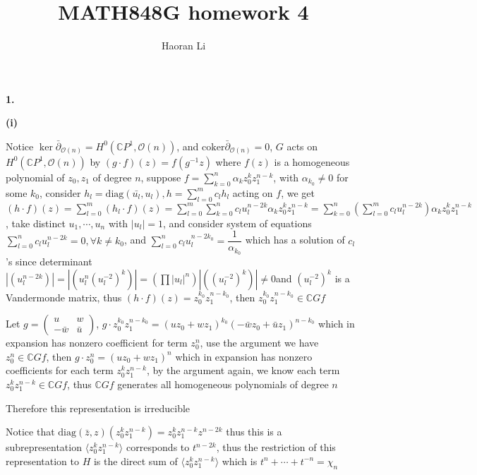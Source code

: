 \documentclass[10pt]{article}
\title{MATH848G homework 4}
\author{Haoran Li}
\date{}
\begin{document}
\maketitle
\textbf{1.} \par
\textbf{(i)} \par
Notice $\ker\bar\partial_{\mathcal O(n)}=H^0(\mathbb CP^1,\mathcal O(n))$, and $\mathrm{coker}\bar\partial_{\mathcal O(n)}=0$, $G$ acts on $H^0(\mathbb CP^1,\mathcal O(n))$ by $(g\cdot f)(z)=f(g^{-1}z)$ where $f(z)$ is a homogeneous polynomial of $z_0,z_1$ of degree $n$, suppose $\displaystyle f=\sum_{k=0}^n\alpha_kz_0^kz_1^{n-k}$, with $\alpha_{k_0}\neq0$ for some $k_0$, consider $\displaystyle h_l= \mathrm{diag}(\bar {u_l},u_l), h=\sum_{l=0}^m c_lh_l$ acting on $f$, we get $(h\cdot f)(z)=\sum_{l=0}^m(h_l\cdot f)(z)=\displaystyle\sum_{l=0}^m\sum_{k=0}^n c_lu_l^{n-2k}\alpha_kz_0^kz_1^{n-k}=\sum_{k=0}^n\left(\sum_{l=0}^m c_lu_l^{n-2k}\right)\alpha_kz_0^kz_1^{n-k}$, take distinct $u_1,\cdots,u_n$ with $|u_l|=1$, and consider system of equations $\displaystyle\sum_{l=0}^n c_lu_l^{n-2k}=0,\forall k\neq k_0$, and $\displaystyle\sum_{l=0}^n c_lu_l^{n-2k_0}=\dfrac{1}{\alpha_{k_0}}$ which has a solution of $c_l$'s since determinant $\left|(u_l^{n-2k})\right|=\left|\left(u_l^{n}(u_l^{-2})^k\right)\right|=\left(\prod |u_l|^{n}\right)\left|\left((u_l^{-2})^k\right)\right|\neq0$and $(u_l^{-2})^k$ is a Vandermonde matrix, thus $(h\cdot f)(z)=z_0^{k_0}z_1^{n-k_0}$, then $z_0^{k_0}z_1^{n-k_0}\in \mathbb CGf$ \par
Let $g=\begin{pmatrix}
u&w \\
-\bar w&\bar u
\end{pmatrix}$, $g\cdot z_0^{k_0}z_1^{n-k_0}=\left(uz_0+wz_1\right)^{k_0}\left(-\bar wz_0+\bar uz_1\right)^{n-k_0}$ which in expansion has nonzero coefficient for term $z_0^n$, use the argument we have $z_0^n\in\mathbb CGf$, then $g\cdot z_0^n=\left(uz_0+wz_1\right)^n$ which in expansion has nonzero coefficients for each term $z_0^kz_1^{n-k}$, by the argument again, we know each term $z_0^kz_1^{n-k}\in\mathbb CGf$, thus $\mathbb CGf$ generates all homogeneous polynomials of degree $n$ \par
Therefore this representation is irreducible \par
Notice that $\mathrm{diag}(\bar z,z)(z_0^kz_1^{n-k})=z_0^kz_1^{n-k}z^{n-2k}$ thus this is a subrepresentation $\langle z_0^kz_1^{n-k}\rangle$ corresponds to $t^{n-2k}$, thus the restriction of this representation to $H$ is the direct sum of $\langle z_0^kz_1^{n-k}\rangle$ which is $t^n+\cdots+t^{-n}=\chi_n$ \par
\end{document}
